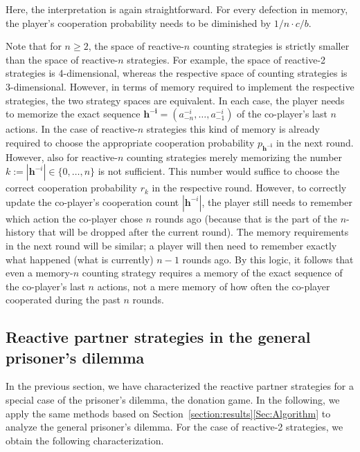 \documentclass[9pt,twoside,lineno]{pnas-new}
\theoremstyle{plainCl1}
\theoremstyle{plainCl2}
\begin{document}
\noindent
Here, the interpretation is again straightforward.
For every defection in memory, the player's cooperation probability needs to be diminished by $1/n\cdot c/b$. 

Note that for $n\!\ge\!2$, the space of reactive-$n$ counting strategies is strictly smaller than the space of reactive-$n$ strategies. 
For example, the space of reactive-2 strategies is 4-dimensional, whereas the respective space of counting strategies is 3-dimensional. 
However, in terms of memory required to implement the respective strategies, the two strategy spaces are equivalent. 
In each case, the player needs to memorize the exact sequence $\mathbf{h^{-i}}\!=\!(a^{-i}_{-n},\ldots, a^{-i}_{-1})$ of the co-player's last $n$ actions. 
In the case of reactive-$n$ strategies this kind of memory is already required to choose the appropriate cooperation probability $p_{\mathbf{h^{-i}}}$ in the next round. 
However, also for reactive-$n$ counting strategies merely memorizing the number $k:=|\mathbf{h}^{-i}| \in \{0,\ldots,n\}$ is not sufficient. 
This number would suffice to choose the correct cooperation probability $r_k$ in the respective round. 
However, to correctly update the co-player's cooperation count $|\mathbf{h}^{-i}|$, the player still needs to remember which action the co-player chose $n$ rounds ago (because that is the part of the $n$-history that will be dropped after the current round). 
The memory requirements in the next round will be similar; a player will then need to remember exactly what happened (what is currently) $n\!-\!1$ rounds ago. 
By this logic, it follows that even a memory-$n$ counting strategy requires a memory of the exact sequence of the co-player's last $n$ actions, not a mere memory of how often the co-player cooperated during the past $n$ rounds. 


\subsection{Reactive partner strategies in the general prisoner's dilemma}\label{section:general_prisoners_dilemma}

In the previous section, we have characterized the reactive partner strategies for a special case of the prisoner's dilemma, the donation game. 
In the following, we apply the same methods based on Section~\ref{section:results}\ref{Sec:Algorithm} to analyze the general prisoner's dilemma. 
For  the case of reactive-2 strategies, we obtain the following characterization. 
\end{document}
